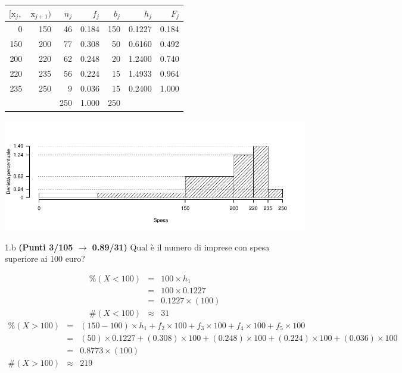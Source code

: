\documentclass[
  11pt,
]{book}
\theoremstyle{mytheoremstyle}
\theoremstyle{mydefstyle}
\newenvironment{sol}
  {
  \begin{tcolorbox}[enhanced,breakable,arc=0.1mm,boxrule=1pt,colback=white,colframe=iblue,
  title=\bf \fontfamily{lmss}\selectfont \hspace{.5 cm} Soluzione,drop fuzzy shadow]

}{
\end{tcolorbox}
  }
\begin{document}
\begin{sol}

\begin{table}[H]
\centering
\begin{tabular}{rrrrrrr}
\toprule
$[\text{x}_j,$ & $\text{x}_{j+1})$ & $n_j$ & $f_j$ & $b_j$ & $h_j$ & $F_j$\\
\midrule
0 & 150 & 46 & 0.184 & 150 & 0.1227 & 0.184\\
150 & 200 & 77 & 0.308 & 50 & 0.6160 & 0.492\\
200 & 220 & 62 & 0.248 & 20 & 1.2400 & 0.740\\
220 & 235 & 56 & 0.224 & 15 & 1.4933 & 0.964\\
235 & 250 & 9 & 0.036 & 15 & 0.2400 & 1.000\\
 &  & 250 & 1.000 & 250 &  & \\
\bottomrule
\end{tabular}
\end{table}

\begin{center}\includegraphics{Esami_passati_con_soluzioni_files/figure-latex/2023-193-1} \end{center}

\end{sol}

1.b \textbf{(Punti 3/105 \(\rightarrow\) 0.89/31)} Qual è il numero di imprese con spesa superiore ai 100 euro?

\begin{sol}
\begin{eqnarray*}
     \%(X< 100 ) &=& 100 \times h_1 \\
              &=& 100 \times  0.1227 \\
              &=&  0.1227 \times(100) \\
     \#(X< 100 ) &\approx& 31 
         \end{eqnarray*}\begin{eqnarray*}
     \%(X> 100 ) &=& ( 150 - 100 )\times h_{ 1 }+ f_{ 2 }\times 100+f_{ 3 }\times 100+f_{ 4 }\times 100+f_{ 5 }\times 100 \\
              &=& ( 50 )\times 0.1227 + ( 0.308 )\times 100+( 0.248 )\times 100+( 0.224 )\times 100+( 0.036 )\times 100 \\
              &=&  0.8773 \times(100)\\
     \#(X> 100 ) &\approx& 219 
         \end{eqnarray*}

\end{sol}
\end{document}
